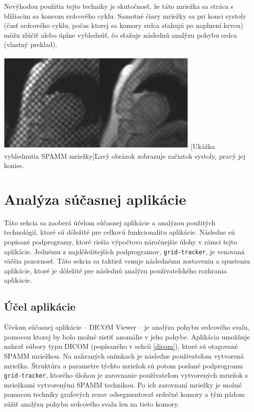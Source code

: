 Nevýhodou použitia tejto techniky je skutočnosť, že táto mriežka sa stráca s blížiacim sa koncom srdcového cyklu. Samotné čiary mriežky sa pri konci systoly (časť srdcového cyklu, počas ktorej sa komory srdca sťahujú po naplnení krvou) môžu zlúčiť alebo úplne vyblednúť, čo sťažuje následnú analýzu pohybu srdca \cite{spamm_description} (vlastný preklad).

\begin {center}
        \centering
        \includegraphics[width=10cm, height=5cm]{media/heart/early_late_systole.png}
        [Ukážka vyblednutia SPAMM mriežky]{Ľavý obrázok zobrazuje začiatok systoly, pravý jej koniec.}
\end {center}

\section {Analýza súčasnej aplikácie}

Táto sekcia sa zaoberá účelom súčasnej aplikácie a analýzou použitých technológií, ktoré sú dôležité pre celkovú funkcionalitu aplikácie. Následne sú popísané podprogramy, ktoré riešia výpočtovo náročnejšie úlohy v rámci tejto aplikácie. Jednému z najdôležitejších podprogramov, \texttt{grid-tracker}, je venovaná väčšia pozornosť. Táto sekcia sa taktiež venuje následnému zostaveniu a spusteniu aplikácie, ktoré je dôležité pre následnú analýzu používateľského rozhrania aplikácie.

\subsection {Účel aplikácie}

Účelom súčasnej aplikácie -- DICOM Viewer -- je analýza pohybu srdcového svalu, pomocou ktorej by bolo možné zistiť anomálie v jeho pohybe. Aplikácia umožňuje nahrať súbory typu DICOM (popísaného v sekcii \ref{dicom}), ktoré sú otagované SPAMM mriežkou. Na nahraných snímkach je následne používateľom vytvorená mriežka. Štruktúra a parametre týchto mriežok sú potom poslané podprogramu \texttt{grid-tracker}, ktorého úlohou je zarovnanie používateľom vytvorených mriežok s mriežkami vytvorenými SPAMM technikou. Po ich zarovnaní mriežky je možné pomocou techniky grafových rezov odsegmentovať srdečné komory a tým pádom zúžiť analýzu pohybu srdcového svalu len na tieto komory.

